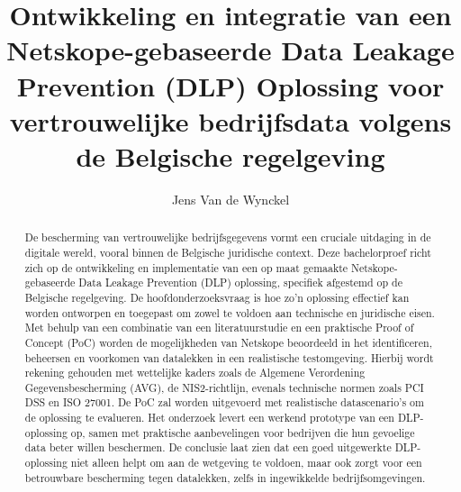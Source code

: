 \documentclass{hogent-article}
\title{Ontwikkeling en integratie van een Netskope-gebaseerde Data Leakage Prevention (DLP) Oplossing voor vertrouwelijke bedrijfsdata volgens de Belgische regelgeving}
\author{Jens Van de Wynckel}
\begin{document}
\begin{abstract}
  De bescherming van vertrouwelijke bedrijfsgegevens vormt een cruciale uitdaging in de digitale wereld, 
  vooral binnen de Belgische juridische context. 
  Deze bachelorproef richt zich op de ontwikkeling en implementatie van een op maat gemaakte Netskope-gebaseerde Data Leakage Prevention (DLP) oplossing, 
  specifiek afgestemd op de Belgische regelgeving. 
  De hoofdonderzoeksvraag is hoe zo'n oplossing effectief kan worden ontworpen en toegepast om zowel te voldoen aan technische en juridische eisen. 
  Met behulp van een combinatie van een literatuurstudie en een praktische Proof of Concept (PoC) worden de mogelijkheden van Netskope beoordeeld in het identificeren, 
  beheersen en voorkomen van datalekken in een realistische testomgeving. Hierbij wordt rekening gehouden met wettelijke kaders zoals de Algemene Verordening Gegevensbescherming (AVG), de NIS2-richtlijn, evenals technische normen zoals PCI DSS en ISO 27001. De PoC zal worden
  uitgevoerd met realistische datascenario's om de oplossing te evalueren. Het onderzoek levert een werkend prototype van een DLP-oplossing op, 
  samen met praktische aanbevelingen voor bedrijven die hun gevoelige data beter willen beschermen. 
  De conclusie laat zien dat een goed uitgewerkte DLP-oplossing niet alleen helpt
  om aan de wetgeving te voldoen, maar ook zorgt voor een betrouwbare bescherming tegen datalekken, zelfs in ingewikkelde bedrijfsomgevingen.
\end{abstract}

\tableofcontents



\printbibliography[heading=bibintoc]
\end{document}
